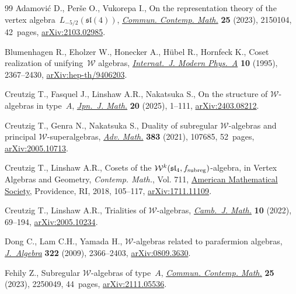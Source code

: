 \documentclass[pdftex]{sigma}
\numberwithin{equation}{section}
\begin{document}
\begin{thebibliography}{99}
Adamovi\'c D., Per\v{s}e O., Vukorepa I., On the representation theory of the
 vertex algebra~{$L_{-5/2}(\mathfrak{sl}(4))$},
 \href{https://doi.org/10.1142/S0219199721501042}{\textit{Commun. Contemp.
 Math.}} \textbf{25} (2023), 2150104, 42~pages,
 \href{http://arxiv.org/abs/2103.02985}{arXiv:2103.02985}.

Blumenhagen R., Eholzer W., Honecker A., H\"{u}bel R., Hornfeck K., Coset
 realization of unifying~{$\mathcal W$} algebras,
 \href{https://doi.org/10.1142/S0217751X95001157}{\textit{Internat.~J. Modern
 Phys.~A}} \textbf{10} (1995), 2367--2430,
 \href{http://arxiv.org/abs/hep-th/9406203}{arXiv:hep-th/9406203}.

Creutzig T., Fasquel J., Linshaw A.R., Nakatsuka S., On the structure of
 {$\mathcal W$}-algebras in type~{$A$},
 \href{https://doi.org/10.1007/s11537-025-2414-2}{\textit{Jpn.~J. Math.}}
 \textbf{20} (2025), 1--111,
 \href{http://arxiv.org/abs/2403.08212}{arXiv:2403.08212}.

Creutzig T., Genra N., Nakatsuka S., Duality of subregular {$\mathcal
 W$}-algebras and principal {$\mathcal W$}-superalgebras,
 \href{https://doi.org/10.1016/j.aim.2021.107685}{\textit{Adv. Math.}}
 \textbf{383} (2021), 107685, 52~pages,
 \href{http://arxiv.org/abs/2005.10713}{arXiv:2005.10713}.

Creutzig T., Linshaw A.R., Cosets of the {$\mathcal{W}^k(\mathfrak{sl}_4,
 f_{\rm subreg})$}-algebra, in Vertex {A}lgebras and {G}eometry,
 \textit{Contemp. Math.}, Vol. 711,
 \href{https://doi.org/10.1090/conm/711/14301}{American Mathematical Society},
 Providence, RI, 2018, 105--117,
 \href{http://arxiv.org/abs/1711.11109}{arXiv:1711.11109}.

Creutzig T., Linshaw A.R., Trialities of {$\mathcal W$}-algebras,
 \href{https://doi.org/10.4310/cjm.2022.v10.n1.a2}{\textit{Camb.~J. Math.}}
 \textbf{10} (2022), 69--194,
 \href{http://arxiv.org/abs/2005.10234}{arXiv:2005.10234}.

Dong C., Lam C.H., Yamada H., {$\mathcal W$}-algebras related to parafermion
 algebras,
 \href{https://doi.org/10.1016/j.jalgebra.2009.03.034}{\textit{J.~Algebra}}
 \textbf{322} (2009), 2366--2403,
 \href{http://arxiv.org/abs/0809.3630}{arXiv:0809.3630}.

Fehily Z., Subregular {$\mathcal W$}-algebras of type~{$A$},
 \href{https://doi.org/10.1142/S0219199722500493}{\textit{Commun. Contemp.
 Math.}} \textbf{25} (2023), 2250049, 44~pages,
 \href{http://arxiv.org/abs/2111.05536}{arXiv:2111.05536}.


\end{thebibliography}
\end{document}
